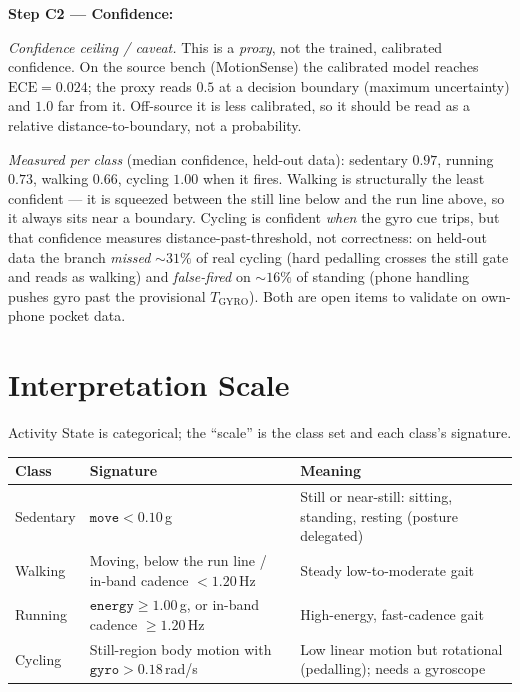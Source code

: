 \noindent\textbf{Step C2 --- Confidence:}

\noindent\emph{Confidence ceiling / caveat.} This is a \emph{proxy}, not the trained,
calibrated confidence. On the source bench (MotionSense) the calibrated model reaches
$\mathrm{ECE}=0.024$; the proxy reads $0.5$ at a decision boundary (maximum uncertainty) and
$1.0$ far from it. Off-source it is less calibrated, so it should be read as a relative
distance-to-boundary, not a probability.

\medskip
\noindent\emph{Measured per class} (median confidence, held-out data): sedentary $0.97$,
running $0.73$, walking $0.66$, cycling $1.00$ when it fires. Walking is structurally the
least confident --- it is squeezed between the still line below and the run line above, so it
always sits near a boundary. Cycling is confident \emph{when} the gyro cue trips, but that
confidence measures distance-past-threshold, not correctness: on held-out data the branch
\emph{missed} ${\sim}31\%$ of real cycling (hard pedalling crosses the still gate and reads as
walking) and \emph{false-fired} on ${\sim}16\%$ of standing (phone handling pushes gyro past
the provisional $T_\text{GYRO}$). Both are open items to validate on own-phone pocket data.

\section{Interpretation Scale}

Activity State is categorical; the ``scale'' is the class set and each class's signature.

\begin{center}
\begin{tabular}{@{}l >{\raggedright\arraybackslash}p{4.6cm} >{\raggedright\arraybackslash}p{5.2cm}@{}}
\toprule
\textbf{Class} & \textbf{Signature} & \textbf{Meaning} \\
\midrule
Sedentary & $\texttt{move}<0.10$\,g & Still or near-still: sitting, standing, resting (posture delegated) \\
Walking   & Moving, below the run line / in-band cadence $<1.20$\,Hz & Steady low-to-moderate gait \\
Running   & $\texttt{energy}\geq 1.00$\,g, or in-band cadence $\geq 1.20$\,Hz & High-energy, fast-cadence gait \\
Cycling   & Still-region body motion with $\texttt{gyro}>0.18$\,rad/s & Low linear motion but rotational (pedalling); needs a gyroscope \\
\bottomrule
\end{tabular}
\end{center}

